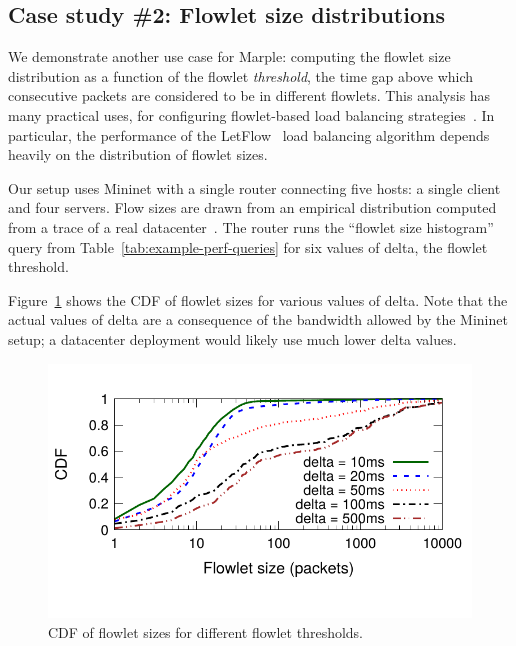 \subsection{Case study \#2: Flowlet size distributions}
\label{s:eval:mininet-flowlet}
\label{sec:eval:mininet-flowlet}

We demonstrate another use case for Marple: computing the flowlet size
distribution as a function of the flowlet \emph{threshold}, the time gap above
which consecutive packets are considered to be in different flowlets.  This
analysis has many practical uses, \eg for configuring flowlet-based load
balancing strategies~\cite{conga, letflow}.  In particular, the performance of
the LetFlow~\cite{letflow} load balancing algorithm depends heavily on the
distribution of flowlet sizes. 

Our setup uses Mininet with a single router connecting five hosts: a single
client and four servers. Flow sizes are drawn from an empirical distribution
computed from a trace of a real datacenter~\cite{empirical-flow-data}.  The
router runs the ``flowlet size histogram'' query from
Table~\ref{tab:example-perf-queries} for six values of {\ct delta}, the
flowlet threshold.

Figure~\ref{fig:flowletcdf} shows the CDF of flowlet sizes for various values
of {\ct delta}. Note that the actual values of {\ct delta} are a consequence of
the bandwidth allowed by the Mininet setup; a datacenter deployment would
likely use much lower {\ct delta} values.

\begin{figure}[!t]
\centering
\vspace{-0.2in}
\includegraphics[width=0.8\columnwidth]{pq_flowlet-cdf.pdf}
\vspace{-0.3in}
\caption{CDF of flowlet sizes for different flowlet thresholds.}
\vspace{-0.15in}
\label{fig:flowletcdf}
\end{figure}

